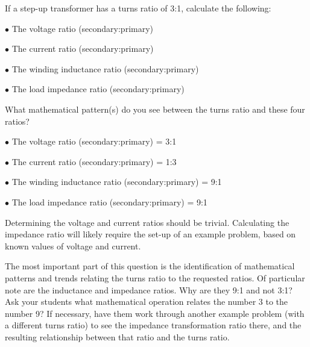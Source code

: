 

If a step-up transformer has a turns ratio of 3:1, calculate the following:

\medskip
\item{$\bullet$} The voltage ratio (secondary:primary)
\item{$\bullet$} The current ratio (secondary:primary)
\item{$\bullet$} The winding inductance ratio (secondary:primary)
\item{$\bullet$} The load impedance ratio (secondary:primary)
\medskip

What mathematical pattern(s) do you see between the turns ratio and these four ratios?







\medskip
\item{$\bullet$} The voltage ratio (secondary:primary) = 3:1
\item{$\bullet$} The current ratio (secondary:primary) = 1:3
\item{$\bullet$} The winding inductance ratio (secondary:primary) = 9:1
\item{$\bullet$} The load impedance ratio (secondary:primary) = 9:1
\medskip







Determining the voltage and current ratios should be trivial.  Calculating the impedance ratio will likely require the set-up of an example problem, based on known values of voltage and current.

The most important part of this question is the identification of mathematical patterns and trends relating the turns ratio to the requested ratios.  Of particular note are the inductance and impedance ratios.  Why are they 9:1 and not 3:1?  Ask your students what mathematical operation relates the number 3 to the number 9?  If necessary, have them work through another example problem (with a different turns ratio) to see the impedance transformation ratio there, and the resulting relationship between that ratio and the turns ratio.




